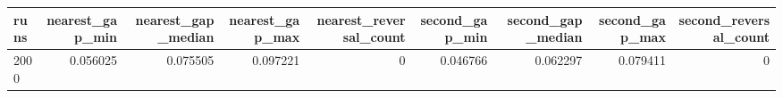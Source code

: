 \begin{tabular}{lrrrrrrrr}
\toprule
runs & nearest\_gap\_min & nearest\_gap\_median & nearest\_gap\_max & nearest\_reversal\_count & second\_gap\_min & second\_gap\_median & second\_gap\_max & second\_reversal\_count \\
\midrule
2000 & 0.056025 & 0.075505 & 0.097221 & 0 & 0.046766 & 0.062297 & 0.079411 & 0 \\
\bottomrule
\end{tabular}
